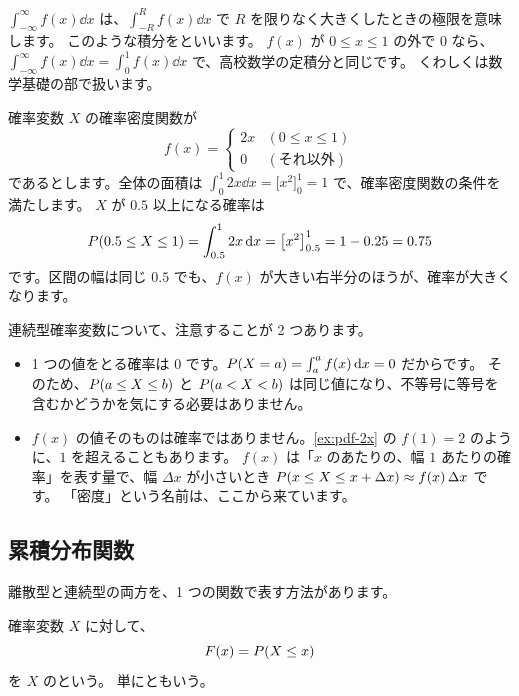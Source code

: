 \begin{mathnote}
  $\int_{-\infty}^{\infty} f(x) \dd x$ は、$\int_{-R}^{R} f(x) \dd x$ で $R$ を限りなく大きくしたときの極限を意味します。
  このような積分をといいます。
  $f(x)$ が $0 \le x \le 1$ の外で $0$ なら、$\int_{-\infty}^{\infty} f(x) \dd x = \int_{0}^{1} f(x) \dd x$ で、高校数学の定積分と同じです。
  くわしくは数学基礎の部で扱います。
\end{mathnote}

\begin{example}[確率密度関数 $f(x) = 2x$][ex:pdf-2x]
  確率変数 $X$ の確率密度関数が
  \[
    f(x) = \begin{cases} 2x & (0 \le x \le 1) \\ 0 & (\text{それ以外}) \end{cases}
  \]
  であるとします。全体の面積は $\int_0^1 2x \dd x = \bigl[x^2\bigr]_0^1 = 1$ で、確率密度関数の条件を満たします。
  $X$ が $0.5$ 以上になる確率は
  \[
    P(0.5 \le X \le 1) = \int_{0.5}^{1} 2x \mathop{}\!\mathrm{d} x = \bigl[x^2\bigr]_{0.5}^{1} = 1 - 0.25 = 0.75
  \]
  です。区間の幅は同じ $0.5$ でも、$f(x)$ が大きい右半分のほうが、確率が大きくなります。
\end{example}

連続型確率変数について、注意することが 2 つあります。
\begin{itemize}
  \item 1 つの値をとる確率は $0$ です。$P(X = a) = \int_a^a f(x) \mathop{}\!\mathrm{d} x = 0$ だからです。
    そのため、$P(a \le X \le b)$ と $P(a < X < b)$ は同じ値になり、不等号に等号を含むかどうかを気にする必要はありません。
  \item $f(x)$ の値そのものは確率ではありません。\cref{ex:pdf-2x} の $f(1) = 2$ のように、$1$ を超えることもあります。
    $f(x)$ は「$x$ のあたりの、幅 $1$ あたりの確率」を表す量で、幅 $\Delta x$ が小さいとき
    $P(x \le X \le x + \Delta x) \approx f(x)\,\Delta x$ です。
    「密度」という名前は、ここから来ています。
\end{itemize}

\subsection{累積分布関数}

離散型と連続型の両方を、1 つの関数で表す方法があります。

\begin{definition}
  確率変数 $X$ に対して、
  \[
    F(x) = P(X \le x)
  \]
  を $X$ のという。
  単にともいう。
\end{definition}

